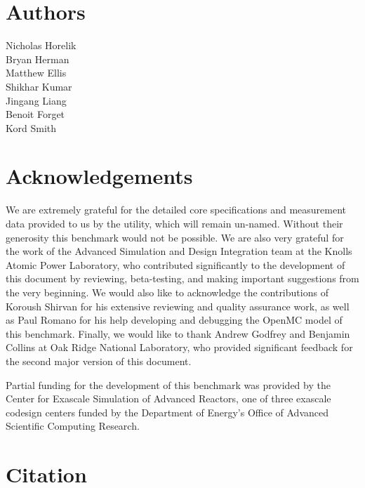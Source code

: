 \section*{Authors}
Nicholas Horelik \\
Bryan Herman \\
Matthew Ellis \\
Shikhar Kumar \\
Jingang Liang \\
Benoit Forget \\
Kord Smith

\section*{Acknowledgements}

We are extremely grateful for the detailed core specifications and measurement
data provided to us by the utility, which will remain un-named. Without their
generosity this benchmark would not be possible. We are also very grateful for
the work of the Advanced Simulation and Design Integration team at the Knolls
Atomic Power Laboratory, who contributed significantly to the development of
this document by reviewing, beta-testing, and making important suggestions from
the very beginning. We would also like to acknowledge the contributions of
Koroush Shirvan for his extensive reviewing and quality assurance work, as well
as Paul Romano for his help developing and debugging the OpenMC model of this
benchmark. Finally, we would like to thank Andrew Godfrey and Benjamin Collins
at Oak Ridge National Laboratory, who provided significant feedback for the
second major version of this document.

Partial funding for the development of this benchmark was provided by the Center
for Exascale Simulation of Advanced Reactors, one of three exascale codesign
centers funded by the Department of Energy’s Office of Advanced Scientific
Computing Research.

\section*{Citation}

\nobibliography*
{}
